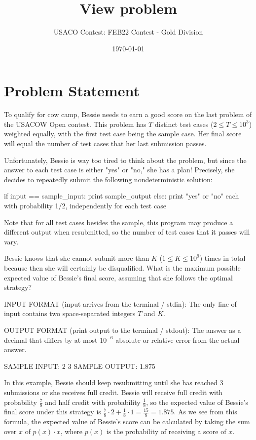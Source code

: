 \documentclass[12pt]{article}
\title{View problem}
\author{USACO Contest: FEB22 Contest - Gold Division}
\date{\today}
\begin{document}
\maketitle

\section*{Problem Statement}

To qualify for cow camp, Bessie needs to earn a good score on the last problem
of the USACOW Open contest. This problem has $T$ distinct test cases
($2\le T\le 10^3$) weighted equally, with the first test case being the sample
case. Her final score will equal the number of test cases that her last
submission passes.

Unfortunately, Bessie is way too tired to think about the problem,  but since
the answer to each test case is either "yes" or "no," she has a plan! Precisely,
she decides to repeatedly submit the following nondeterministic solution:


if input == sample_input:
  print sample_output
else:
  print "yes" or "no" each with probability 1/2, independently for each test case

Note that for all test cases besides the sample, this program may produce a
different output when resubmitted, so the number of test cases that it passes
will vary. 

Bessie knows that she cannot submit more than $K$ ($1\le K\le 10^9$) times in
total because then she will certainly be disqualified. What is the maximum
possible expected value of Bessie's final score, assuming that she follows the
optimal strategy?

INPUT FORMAT (input arrives from the terminal / stdin):
The only line of input contains two space-separated integers $T$ and $K.$

OUTPUT FORMAT (print output to the terminal / stdout):
The answer as a decimal that differs by at most $10^{-6}$ absolute or relative
error from the actual answer.

SAMPLE INPUT:
2 3
SAMPLE OUTPUT: 
1.875

In this example, Bessie should keep resubmitting until she has reached $3$
submissions or she  receives full credit. Bessie will receive full credit with
probability $\frac{7}{8}$ and half credit with probability $\frac{1}{8}$, so the
expected value of Bessie's  final score under this strategy is
$\frac{7}{8}\cdot 2+\frac{1}{8}\cdot 1=\frac{15}{8}=1.875$.  As we see from this
formula, the expected value of Bessie's score can be calculated by  taking the
sum over $x$ of $p(x) \cdot x$, where $p(x)$ is the probability of receiving a
score of
$x$.
\end{document}
